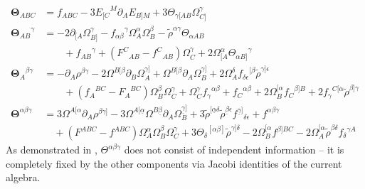 \documentclass[11pt,a4paper]{article}
\numberwithin{equation}{section}
\begin{document}
\begin{align}
	{\mathbf{\Theta}}_{ABC} &= f_{ABC} - 3 {E_{[C}}^M \partial_A E_{B]M} + 3 \Theta_{\gamma [AB} \Omega_{C]}^\gamma  \nonumber \\
	{\mathbf{\Theta}_{AB}}^\gamma &=  - 2 \partial_{[A} \Omega_{B]}^\gamma - {f_{\alpha \beta}}^\gamma \Omega_A^\alpha \Omega_B^\beta - \tilde{\rho}^{ \alpha \gamma } \Theta_{\alpha AB} \nonumber \\
	&{} \qquad + {f_{AB}}^\gamma + ({F^C}_{AB} - {f^C}_{AB}) \Omega_C^\gamma + 2 \Omega^\alpha_{[A} {\Theta_{\alpha B]}}^\gamma \label{eq:GeneralisedCartanCurvatureExplicitGeneric3} \\
	{{\mathbf{\Theta}_A}^{\beta \gamma}} &= - \partial_A \rho^{\beta \gamma} - 2 \Omega^{B [{\beta} } \partial_B \Omega^{{\gamma}]}_A + \Omega^{B [{\beta}} \partial_A \Omega^{{\gamma}]}_B   + 2 \Omega^{\delta }_A {f_{\delta \epsilon}}^{[\beta} \tilde{\rho}^{{\gamma}] \epsilon} \nonumber \\
	&{} \qquad + ( {f_A}^{BC} - {F_A}^{BC} ) \Omega_B^\beta \Omega_C^\gamma + \Omega_C^\gamma {f_\gamma}^{\alpha \beta} + {f_C}^{\alpha \beta} + 2\Omega^{[\alpha}_B {f_C}^{\beta] B} + 2 {f_{\gamma}}^{C[\alpha} \tilde{\rho}^{\beta] \gamma} \\
	{\mathbf{\Theta}^{\alpha \beta \gamma}} &= 3 \Omega^{A [\alpha} \partial_A \rho^{\beta \gamma]} - 3 \Omega^{A[\underline{\alpha}} \Omega^{B \underline{\beta	}} \partial_A \Omega^{\underline{\gamma}]}_B + 3 \tilde{\rho}^{[\underline{\alpha}\delta} \tilde{\rho}^{\underline{\beta} \epsilon} f^{\underline{\gamma}]}{}_{\delta \epsilon}
	+ f^{\alpha \beta \gamma} \nonumber \\
	&{} \quad + (F^{ABC} - f^{ABC}) \Omega_A^\alpha \Omega_B^\beta \Omega_C^\gamma + 3 {\Theta_\delta}^{[\alpha \beta]} \tilde{\rho}^{\gamma]\delta} - 2 \Omega^{[\alpha}_B f^{\beta] BC} - 2 \Omega^{[\alpha}_A \tilde{\rho}^{\beta \delta} {f_\delta}^{\gamma A}
\end{align}
As demonstrated in \cite{Butter:2021dtu}, $\Theta^{\alpha \beta \gamma}$ does not consist of independent information -- it is completely fixed by the other components via Jacobi identities of the current algebra.
\end{document}
